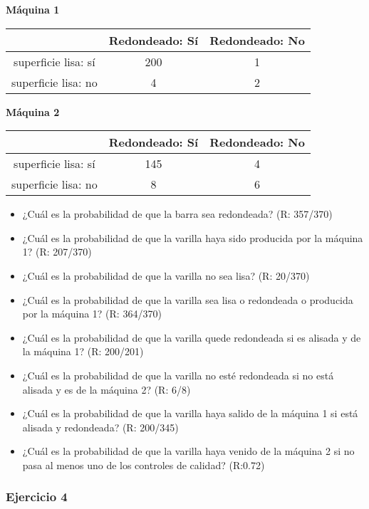 \documentclass[
]{book}
\providecommand{\tightlist}{%
  \setlength{\itemsep}{0pt}\setlength{\parskip}{0pt}}
\begin{document}
\textbf{Máquina 1}

\begin{longtable}[]{@{}ccc@{}}
\toprule
& Redondeado: Sí & Redondeado: No \\
\midrule
\endhead
superficie lisa: sí & 200 & 1 \\
superficie lisa: no & 4 & 2 \\
\bottomrule
\end{longtable}

\textbf{Máquina 2}

\begin{longtable}[]{@{}ccc@{}}
\toprule
& Redondeado: Sí & Redondeado: No \\
\midrule
\endhead
superficie lisa: sí & 145 & 4 \\
superficie lisa: no & 8 & 6 \\
\bottomrule
\end{longtable}

\begin{itemize}
\tightlist
\item
  ¿Cuál es la probabilidad de que la barra sea redondeada? (R: 357/370)
\item
  ¿Cuál es la probabilidad de que la varilla haya sido producida por la máquina 1? (R: 207/370)
\item
  ¿Cuál es la probabilidad de que la varilla no sea lisa? (R: 20/370)
\item
  ¿Cuál es la probabilidad de que la varilla sea lisa o redondeada o producida por la máquina 1? (R: 364/370)
\item
  ¿Cuál es la probabilidad de que la varilla quede redondeada si es alisada y de la máquina 1? (R: 200/201)
\item
  ¿Cuál es la probabilidad de que la varilla no esté redondeada si no está alisada y es de la máquina 2? (R: 6/8)
\item
  ¿Cuál es la probabilidad de que la varilla haya salido de la máquina 1 si está alisada y redondeada? (R: 200/345)
\item
  ¿Cuál es la probabilidad de que la varilla haya venido de la máquina 2 si no pasa al menos uno de los controles de calidad? (R:0.72)
\end{itemize}

\hypertarget{ejercicio-4}{%
\subsubsection{Ejercicio 4}\label{ejercicio-4}}
\end{document}
